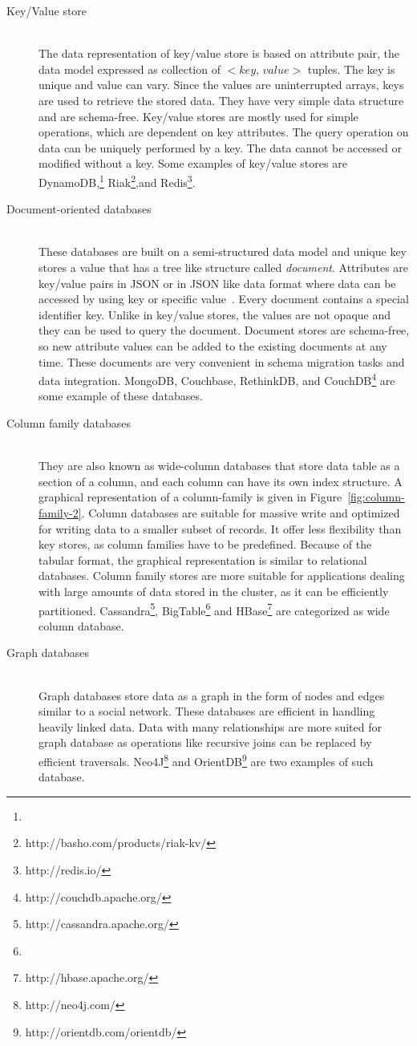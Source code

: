 \documentclass[a4paper,12pt]{book}
\begin{document}
	\begin{description}
		\item[Key/Value store] \hfill \\ 
		The data representation of key/value store is based on attribute pair, the data model expressed as collection of $<$$key$, $value$$>$ tuples. The key is unique and value can vary. Since the values are uninterrupted arrays, keys are used to retrieve the stored data. They have very simple data structure and are schema-free. Key/value stores are mostly used for simple operations, which are dependent on key attributes. The query operation on data can be uniquely performed by a key. The data cannot be accessed or modified without a key. Some examples of key/value stores are DynamoDB,\footnote{} Riak\footnote{http://basho.com/products/riak-kv/},and Redis\footnote{http://redis.io/}.
		\item[Document-oriented databases] \hfill \\ 
	These databases	are built on a semi-structured data model and unique key stores a value that has a tree like structure called \textit{document}. Attributes are key/value pairs in JSON or in JSON like data format where data can be accessed by using key or specific value~\citep{hecht2011nosql}. Every document contains a special identifier key. Unlike in key/value stores, the values are not opaque and  they can be used to query the document. Document stores are schema-free, so new attribute values can be added to the existing documents at any time. These documents are very convenient in schema migration tasks and data integration.  MongoDB, Couchbase, RethinkDB, and CouchDB\footnote{http://couchdb.apache.org/} are some example of these databases.
		\item [Column family databases] \hfill \\
		They are also known as wide-column databases that store data table as a section of a column, and each column can have  its own index structure. A graphical representation of a column-family is given in  Figure~\ref{fig:column-family-2}. Column databases are suitable for massive write  and optimized for writing data to a smaller subset of records. It offer less flexibility than key stores, as column families have to be predefined. Because of the tabular format, the graphical representation is similar to relational databases. Column family stores are more suitable for applications dealing with large amounts of data stored in the cluster, as it can be efficiently partitioned.  Cassandra\footnote{http://cassandra.apache.org/}, BigTable\footnote{} and HBase\footnote{http://hbase.apache.org/} are categorized as wide column database.
		\item[Graph databases] \hfill \\
		Graph databases store data as a  graph in the form of nodes and edges similar to a social network. These databases are efficient in handling heavily linked data. Data with many relationships are more suited for graph database as  operations like recursive joins can be replaced by efficient traversals. Neo4J\footnote{http://neo4j.com/} and OrientDB\footnote{http://orientdb.com/orientdb/} are two examples of such database.

\end{description}
	
\end{document}
